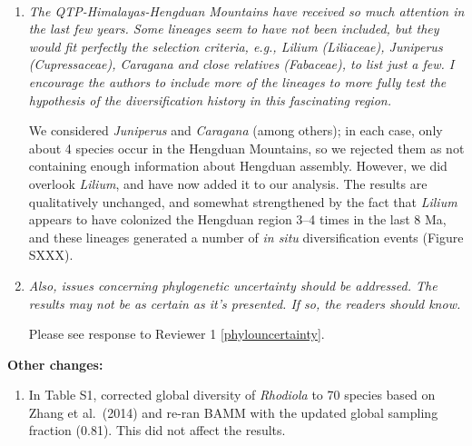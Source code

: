 \documentclass[11pt]{letter}
\begin{document}
\begin{letter}{ \\

}
\begin{enumerate}
  Despite the uncertainty and scarcity of information needed to
  distinguish the Himalayas and QTP proper in terms of plant species
  distributions, we recoded our data set, treating them as separate
  areas (line 184). We scored 210 out of 4,668 species (4.5\%) as
  occurring in the QTP. We then generated new ancestral range
  reconstructions and estimated rates of dispersal and \textit{in
    situ} diversification through time. The results, summarized in
  Figures S3--S5, are virtually identical to the original results with
  respect to Hengduan assembly dynamics.

\item \textit{The QTP-Himalayas-Hengduan Mountains have received so
    much attention in the last few years. Some lineages seem to have
    not been included, but they would fit perfectly the selection
    criteria, e.g., Lilium (Liliaceae), Juniperus (Cupressaceae),
    Caragana and close relatives (Fabaceae), to list just a few. I
    encourage the authors to include more of the lineages to more
    fully test the hypothesis of the diversification history in this
    fascinating region.}

  We considered \textit{Juniperus} and \textit{Caragana} (among
  others); in each case, only about 4 species occur in the Hengduan
  Mountains, so we rejected them as not containing enough information
  about Hengduan assembly. However, we did overlook \textit{Lilium},
  and have now added it to our analysis. The results are qualitatively
  unchanged, and somewhat strengthened by the fact that
  \textit{Lilium} appears to have colonized the Hengduan region 3--4
  times in the last 8 Ma, and these lineages generated a number of
  \textit{in situ} diversification events (Figure SXXX).

\item \textit{Also, issues concerning phylogenetic uncertainty should
    be addressed. The results may not be as certain as it's
    presented. If so, the readers should know.}

  Please see response to Reviewer 1 \ref{phylouncertainty}.

\end{enumerate}

\textbf{Other changes:}

\begin{enumerate}

\item In Table S1, corrected global diversity of \textit{Rhodiola} to
  70 species based on Zhang et al.\ (2014) and re-ran BAMM with the
  updated global sampling fraction (0.81). This did not affect the
  results.


\end{enumerate}
\end{letter}
\end{document}
